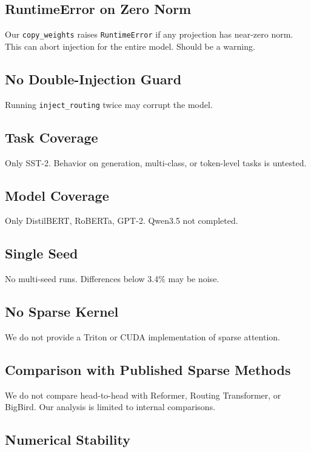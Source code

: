 \subsection{RuntimeError on Zero Norm}

Our \texttt{copy\_weights} raises \texttt{RuntimeError} if any projection has near-zero 
norm. This can abort injection for the entire model. Should be a warning.

\subsection{No Double-Injection Guard}

Running \texttt{inject\_routing} twice may corrupt the model.

\subsection{Task Coverage}

Only SST-2. Behavior on generation, multi-class, or token-level tasks is 
untested.

\subsection{Model Coverage}

Only DistilBERT, RoBERTa, GPT-2. Qwen3.5 not completed.

\subsection{Single Seed}

No multi-seed runs. Differences below 3.4\% may be noise.

\subsection{No Sparse Kernel}

We do not provide a Triton or CUDA implementation of sparse attention.

\subsection{Comparison with Published Sparse Methods}

We do not compare head-to-head with Reformer, Routing Transformer, or 
BigBird. Our analysis is limited to internal comparisons.

\subsection{Numerical Stability}

